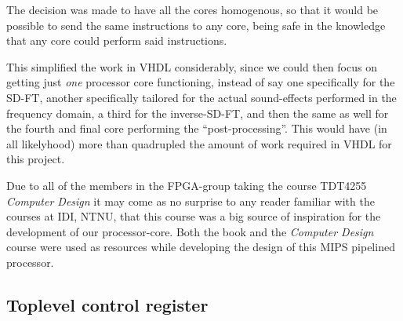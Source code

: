 The decision was made to have all the cores homogenous, so that it would be
possible to send the same instructions to any core, being safe in the knowledge
that any core could perform said instructions.

This simplified the work in VHDL considerably, since we could then focus on
getting just \emph{one} processor core functioning, instead of say one
specifically for the SD-FT, another specifically tailored for the actual
sound-effects performed in the frequency domain, a third for the inverse-SD-FT,
and then the same as well for the fourth and final core performing the
``post-processing''. This would have (in all likelyhood) more than quadrupled
the amount of work required in VHDL for this project.

Due to all of the members in the FPGA-group taking the course TDT4255 \emph{
Computer Design} it may come as no surprise to any reader familiar with the
courses at IDI, NTNU, that this course was a big source of inspiration for the
development of our processor-core. Both the book\cite{tdt4255-book} and the
\emph{Computer Design} course were used as resources while developing the design
of this MIPS pipelined processor.

\subsection{Toplevel control register}\label{subsection:fpga-design-toplevel}

